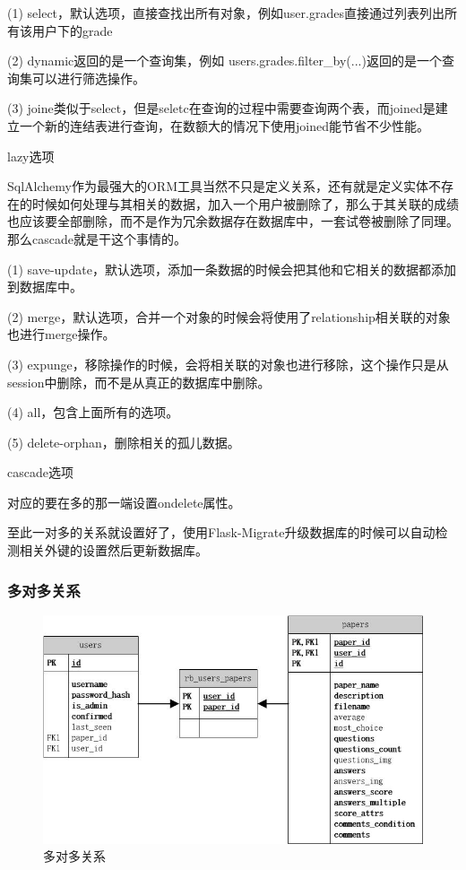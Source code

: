 (1) select，默认选项，直接查找出所有对象，例如user.grades直接通过列表列出所有该用户下的grade

(2) dynamic返回的是一个查询集，例如 users.grades.filter\_by(...)返回的是一个查询集可以进行筛选操作。

(3) joine类似于select，但是seletc在查询的过程中需要查询两个表，而joined是建立一个新的连结表进行查询，在数额大的情况下使用joined能节省不少性能。

\begin{center}
	{\small lazy选项}
\end{center}

SqlAlchemy作为最强大的ORM工具当然不只是定义关系，还有就是定义实体不存在的时候如何处理与其相关的数据，加入一个用户被删除了，那么于其关联的成绩也应该要全部删除，而不是作为冗余数据存在数据库中，一套试卷被删除了同理。那么cascade就是干这个事情的。

(1) save-update，默认选项，添加一条数据的时候会把其他和它相关的数据都添加到数据库中。

(2) merge，默认选项，合并一个对象的时候会将使用了relationship相关联的对象也进行merge操作。

(3) expunge，移除操作的时候，会将相关联的对象也进行移除，这个操作只是从session中删除，而不是从真正的数据库中删除。

(4) all，包含上面所有的选项。

(5) delete-orphan，删除相关的孤儿数据。

\begin{center}
	{\small cascade选项}
\end{center}

对应的要在多的那一端设置ondelete属性。

至此一对多的关系就设置好了，使用Flask-Migrate升级数据库的时候可以自动检测相关外键的设置然后更新数据库。

\subsubsection{多对多关系}

\begin{figure}[thbp!]
	\centering
	\includegraphics[width=1.0\linewidth]{figure/rb_users_papers}
	\caption{多对多关系}
	\label{fig:rb_users_papers}
\end{figure}

